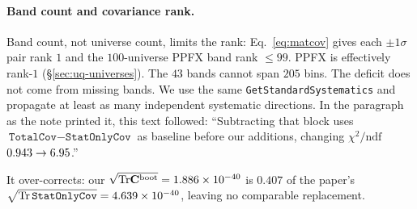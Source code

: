 \paragraph{Band count and covariance rank.} Band count, not universe count, limits the rank: Eq.~\eqref{eq:matcov} gives each $\pm1\sigma$ pair rank $1$ and the $100$-universe PPFX band rank $\le 99$. PPFX is effectively rank-$1$ (\S\ref{sec:uq-universes}). The $43$ bands cannot span $205$ bins. The deficit does not come from missing bands. We use the same \texttt{GetStandardSystematics} and propagate at least as many independent systematic directions. In the paragraph as the note printed it, this text followed: ``Subtracting that block uses $\texttt{TotalCov}-\texttt{StatOnlyCov}$ as baseline before our additions, changing $\chi^{2}/\mathrm{ndf}$ $0.943\to 6.95$.''\par It over-corrects: our $\sqrt{\mathrm{Tr}\mathbf{C}^{\text{boot}}}=1.886\times10^{-40}$ is $0.407$ of the paper's $\sqrt{\mathrm{Tr}\,\texttt{StatOnlyCov}}=4.639\times10^{-40}$, leaving no comparable replacement.

